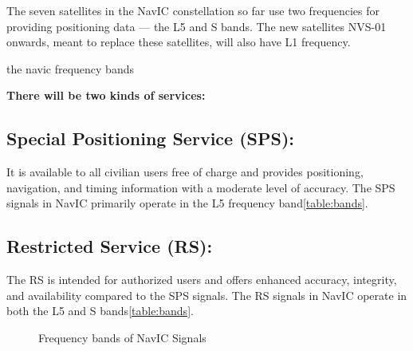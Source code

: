 




%


		The seven satellites in the NavIC constellation so far use two frequencies for providing positioning data — the L5 and S bands. The new satellites NVS-01 onwards, meant to replace these satellites, will also have L1 frequency.
	
		
	\begin{table}[h!]
	\small
	\centering
	\caption{the navic frequency bands}
	\label{table:bands}
	
	\end{table}




\textbf{There will be two kinds of services:}
		

\subsection{Special Positioning Service (SPS):}
	It is available to all civilian users free of charge and provides positioning, navigation, and timing information with a moderate level of accuracy. The SPS signals in NavIC primarily operate in the L5 frequency band\ref{table:bands}.
\subsection{Restricted Service (RS):}
The RS is intended for authorized users and offers enhanced accuracy, integrity, and availability compared to the SPS signals. The RS signals in NavIC operate in both the L5 and S bands\ref{table:bands}.
\\	
	\begin{figure}[h!]
	\centering
	
	\caption{Frequency bands of NavIC Signals}
	\label{figure:bandsfig}
	\end{figure}
	
